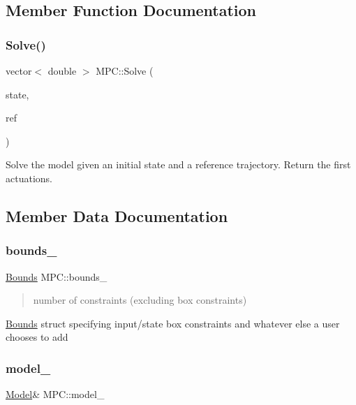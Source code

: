 \subsection{Member Function Documentation}
\mbox{\label{classMPC_ae07d02edbf31f94d738cfa206e5b2d77}} 
\subsubsection{\texorpdfstring{Solve()}{Solve()}}
{\footnotesize\ttfamily vector$<$ double $>$ M\+P\+C\+::\+Solve (\begin{DoxyParamCaption}\item[{const Vector\+Xd \&}]{state,  }\item[{const Vector\+Xd \&}]{ref }\end{DoxyParamCaption})\hspace{0.3cm}{\ttfamily [virtual]}}

Solve the model given an initial state and a reference trajectory. Return the first actuations. 

\subsection{Member Data Documentation}
\mbox{\label{classMPC_a821e5a57b25e8c83aaae02d44dab3ea8}} 
\subsubsection{\texorpdfstring{bounds\+\_\+}{bounds\_}}
{\footnotesize\ttfamily \mbox{\hyperlink{structBounds}{Bounds}} M\+P\+C\+::bounds\+\_\+\hspace{0.3cm}{\ttfamily [protected]}}

\begin{quote}
number of constraints (excluding box constraints) \end{quote}
\mbox{\hyperlink{structBounds}{Bounds}} struct specifying input/state box constraints and whatever else a user chooses to add \mbox{\label{classMPC_abbf9a3b26a6cbc6cad87cac1c8f2aaaf}} 
\subsubsection{\texorpdfstring{model\+\_\+}{model\_}}
{\footnotesize\ttfamily \mbox{\hyperlink{classModel}{Model}}\& M\+P\+C\+::model\+\_\+\hspace{0.3cm}{\ttfamily [protected]}}

